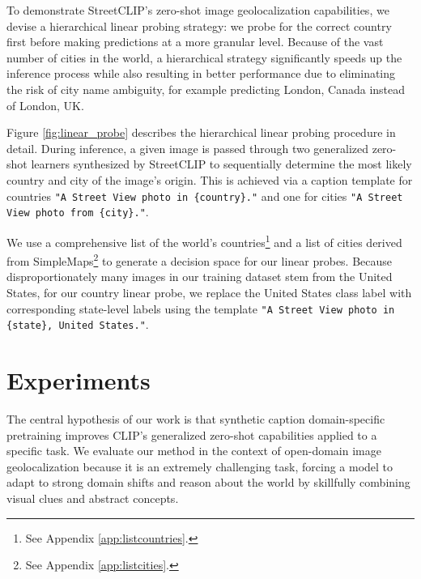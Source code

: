 \documentclass{article}
\begin{document}
To demonstrate StreetCLIP's zero-shot image geolocalization capabilities, we devise a hierarchical linear probing strategy: we probe for the correct country first before making predictions at a more granular level. Because of the vast number of cities in the world, a hierarchical strategy significantly speeds up the inference process while also resulting in better performance due to eliminating the risk of city name ambiguity, for example predicting London, Canada instead of London, UK. 

Figure \ref{fig:linear_probe} describes the hierarchical linear probing procedure in detail. During inference, a given image is passed through two generalized zero-shot learners synthesized by StreetCLIP to sequentially determine the most likely country and city of the image's origin. This is achieved via a caption template for countries \texttt{"A Street View photo in \{country\}."} and one for cities \texttt{"A Street View photo from \{city\}."}.

We use a comprehensive list of the world's countries\footnote{See Appendix \ref{app:listcountries}.} and a list of cities derived from SimpleMaps\footnote{See Appendix \ref{app:listcities}.} to generate a decision space for our linear probes. Because disproportionately many images in our training dataset stem from the United States, for our country linear probe, we replace the United States class label with corresponding state-level labels using the template \texttt{"A Street View photo in \{state\}, United States."}.


\section{Experiments}

The central hypothesis of our work is that synthetic caption domain-specific pretraining improves CLIP's generalized zero-shot capabilities applied to a specific task. We evaluate our method in the context of open-domain image geolocalization because it is an extremely challenging task, forcing a model to adapt to strong domain shifts and reason about the world by skillfully combining visual clues and abstract concepts. 
\end{document}
